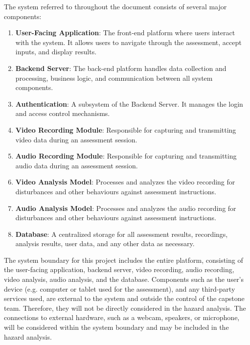 \documentclass{article}
\begin{document}
The system referred to throughout the document consists of several major components: 
\begin{enumerate}
    \item \textbf{User-Facing Application}: The front-end platform where users interact with the system. It allows users to navigate through the assessment, accept inputs, and display results.
    \item \textbf{Backend Server}: The back-end platform handles data collection and processing, business logic, and communication between all system components.
    \item \textbf{Authentication}: A subsystem of the Backend Server. It manages the login and access control mechanisms.
    \item \textbf{Video Recording Module}: Responsible for capturing and transmitting video data during an assessment session.
    \item \textbf{Audio Recording Module}: Responsible for capturing and transmitting audio data during an assessment session.
    \item \textbf{Video Analysis Model}: Processes and analyzes the video recording for disturbances and other behaviours against assessment instructions.
    \item \textbf{Audio Analysis Model}: Processes and analyzes the audio recording for disturbances and other behaviours against assessment instructions.
    \item \textbf{Database}: A centralized storage for all assessment results, recordings, analysis results, user data, and any other data as necessary.
\end{enumerate}

The system boundary for this project includes the entire platform, consisting of the user-facing application, backend server, 
video recording, audio recording, video analysis, audio analysis, and the database. Components such as the user's device (e.g. computer or 
tablet used for the assessment), and any third-party services used, are external to the system and outside the control of 
the capstone team. Therefore, they will not be directly considered in the hazard analysis. The connections to external hardware, such as a webcam, speakers, or microphone,
will be considered within the system boundary and may be included in the hazard analysis.
\end{document}
